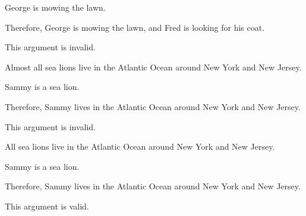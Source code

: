 \begin{enumerate}[(1)]
\noindent\begin{minipage}{0.99\textwidth}
\item
\begin{earg}
\item George is mowing the lawn.
\item Therefore, George is mowing the lawn, and Fred is looking for his coat.
\end{earg}
\noindent This argument is invalid.
\end{minipage}

\item
\begin{earg}
\item Almost all sea lions live in the Atlantic Ocean around New York and New Jersey. 
\item Sammy is a sea lion. 
\item Therefore, Sammy lives in the Atlantic Ocean around New York and New Jersey.
\end{earg}
\noindent This argument is invalid.

\item
\begin{earg}
\item All sea lions live in the Atlantic Ocean around New York and New Jersey. 
\item Sammy is a sea lion. 
\item Therefore, Sammy lives in the Atlantic Ocean around New York and New Jersey.
\end{earg}
\noindent This argument is valid.

\end{enumerate}


